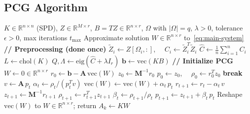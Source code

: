 \documentclass[12pt]{article}
\theoremstyle{definition}
\begin{document}
\subsection{PCG Algorithm}

\begin{algorithm}[H]
\caption{Preconditioned CG for RKHS-CP Mode-$k$ Subproblem}
\label{alg:pcg}
\begin{algorithmic}[1]
\Require $K \in \mathbb{R}^{n\times n}$ (SPD), $Z \in \mathbb{R}^{M\times r}$, $B = TZ \in \mathbb{R}^{n\times r}$, $\Omega$ with $|\Omega|=q$, $\lambda>0$, tolerance $\epsilon>0$, max iterations $t_{\max}$
\Ensure Approximate solution $W \in \mathbb{R}^{n\times r}$ to~\eqref{eq:main-system}
\Statex
\State \textbf{// Preprocessing (done once)}
    \State $\tilde{Z}_i \leftarrow Z[\Omega_i, :]$, $\quad C_i \leftarrow \tilde{Z}_i^T\tilde{Z}_i$ 
\EndFor
\State $\hat{C} \leftarrow \frac{1}{n}\sum_{i=1}^n C_i$ 
\State $L \leftarrow \mathrm{chol}(K)$ 
\State $Q, \Lambda \leftarrow \mathrm{eig}(\hat{C} + \lambda I_r)$ 
\State $\mathbf{b} \leftarrow \mathrm{vec}(KB)$ 
\Statex
\State \textbf{// Initialize PCG}
\State $W \leftarrow 0 \in \mathbb{R}^{n\times r}$ 
\State $r_0 \leftarrow \mathbf{b} - \mathbf{A}\,\mathrm{vec}(W)$ 
\State $z_0 \leftarrow \mathbf{M}^{-1} r_0$ 
\State $p_0 \leftarrow z_0$, $\quad \rho_0 \leftarrow r_0^T z_0$
\Statex
{}
     \textbf{break} \EndIf
    \State $v \leftarrow \mathbf{A}\,p_t$ 
    \State $\alpha_t \leftarrow \rho_t / (p_t^T v)$ 
    \State $\mathrm{vec}(W) \leftarrow \mathrm{vec}(W) + \alpha_t\,p_t$ 
    \State $r_{t+1} \leftarrow r_t - \alpha_t\,v$ 
    \State $z_{t+1} \leftarrow \mathbf{M}^{-1} r_{t+1}$ 
    \State $\rho_{t+1} \leftarrow r_{t+1}^T z_{t+1}$
    \State $\beta_t \leftarrow \rho_{t+1}/\rho_t$
    \State $p_{t+1} \leftarrow z_{t+1} + \beta_t\,p_t$ 
\EndFor
\Statex
\Ensure Reshape $\mathrm{vec}(W)$ to $W \in \mathbb{R}^{n\times r}$; return $A_k \leftarrow KW$
\end{algorithmic}
\end{algorithm}
\end{document}
